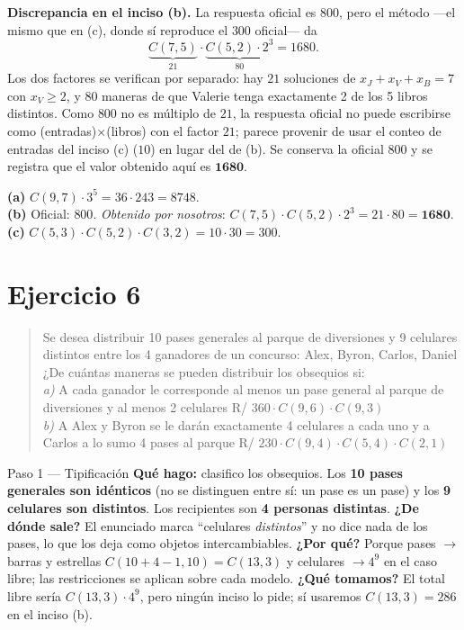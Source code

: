 \documentclass[11pt]{article}
\begin{document}
\begin{nota}
\textbf{Discrepancia en el inciso (b).} La respuesta oficial es $800$, pero el método —el mismo que en (c), donde sí reproduce el $300$ oficial— da
\[
\underbrace{C(7,5)}_{21}\cdot\underbrace{C(5,2)\cdot 2^3}_{80}=1680 .
\]
Los dos factores se verifican por separado: hay $21$ soluciones de $x_J+x_V+x_B=7$ con $x_V\ge 2$, y $80$ maneras de que Valerie tenga exactamente 2 de los 5 libros distintos. Como $800$ no es múltiplo de $21$, la respuesta oficial no puede escribirse como (entradas)$\times$(libros) con el factor $21$; parece provenir de usar el conteo de entradas del inciso (c) ($10$) en lugar del de (b). Se conserva la oficial $800$ y se registra que el valor obtenido aquí es $\mathbf{1680}$.
\end{nota}

\begin{resp}
\textbf{(a)} $C(9,7)\cdot 3^5=36\cdot 243=8748$.\\
\textbf{(b)} Oficial: $800$. \emph{Obtenido por nosotros}: $C(7,5)\cdot C(5,2)\cdot 2^3=21\cdot 80=\mathbf{1680}$.\\
\textbf{(c)} $C(5,3)\cdot C(5,2)\cdot C(3,2)=10\cdot 30=300$.
\end{resp}

\section*{Ejercicio 6}

\begin{quote}
Se desea distribuir 10 pases generales al parque de diversiones y 9 celulares distintos entre los 4 ganadores de un concurso: Alex, Byron, Carlos, Daniel ¿De cuántas maneras se pueden distribuir los obsequios si:\\
\textit{a)} A cada ganador le corresponde al menos un pase general al parque de diversiones y al menos 2 celulares \hfill R/ $360\cdot C(9,6)\cdot C(9,3)$\\
\textit{b)} A Alex y Byron se le darán exactamente 4 celulares a cada uno y a Carlos a lo sumo 4 pases al parque \hfill R/ $230\cdot C(9,4)\cdot C(5,4)\cdot C(2,1)$
\end{quote}

\begin{paso}{Paso 1 --- Tipificación}
\textbf{Qué hago:} clasifico los obsequios.
Los \textbf{10 pases generales son idénticos} (no se distinguen entre sí: un pase es un pase) y los \textbf{9 celulares son distintos}. Los recipientes son \textbf{4 personas distintas}.
\textbf{¿De dónde sale?} El enunciado marca ``celulares \emph{distintos}'' y no dice nada de los pases, lo que los deja como objetos intercambiables.
\textbf{¿Por qué?} Porque pases $\to$ barras y estrellas $C(10+4-1,10)=C(13,3)$ y celulares $\to 4^{9}$ en el caso libre; las restricciones se aplican sobre cada modelo.
\textbf{¿Qué tomamos?} El total libre sería $C(13,3)\cdot 4^9$, pero ningún inciso lo pide; sí usaremos $C(13,3)=286$ en el inciso (b).
\end{paso}
\end{document}
